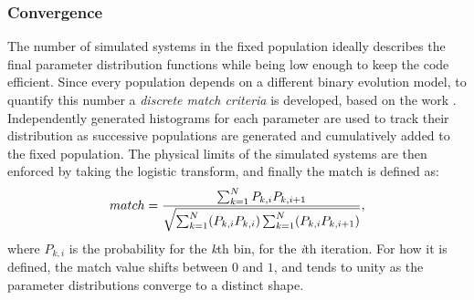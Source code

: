 \subsubsection{Convergence}
The number of simulated systems in the fixed population ideally describes the final parameter distribution functions while being low enough to keep the code efficient. 
Since every population depends on a different binary evolution model, to quantify this number a \textit{discrete match criteria} is developed, based on the work \cite{Chatziioannou17}.
Independently generated histograms for each parameter are used to track their distribution as successive populations are generated and cumulatively added to the fixed population.
The physical limits of the simulated systems are then enforced by taking the logistic transform, and finally the match is defined as: 
\begin{equation}
    match=\displaystyle\frac{\sum_{k=1}^{N}P_{k,i} P_{k,i+1}}{\sqrt{\sum_{k=1}^{N}(P_{k,i}P_{k,i})\sum_{k=1}^{N}(P_{k,i}P_{k,i+1})}},
    \label{eq: match condition}
    \notag
\end{equation}
where $P_{k,i}$ is the probability for the \textit{k}th bin, for the \textit{i}th iteration.
For how it is defined, the match value shifts between $0$ and $1$, and tends to unity as the parameter distributions converge to a distinct shape.

